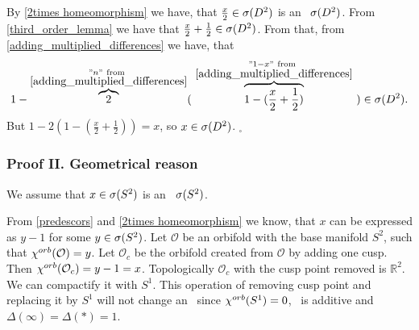 By \ref{2times homeomorphism} we have, that 
$\frac{x}{2} \in {{\sigma}(D^2)}$ is an \apots\ ${{\sigma}(D^2)}$. From \ref{third_order_lemma} we have that 
$\frac{x}{2} + \frac{1}{2} \in {{\sigma}(D^2)}$. From that, from \ref{adding_multiplied_differences} 
we have, 
that \begin{equation}
1-\overbrace{2}^{\substack{"n"\rm\ from\ \\ 
\rm \ref{adding_multiplied_differences}}} 
(\ \overbrace{1-(\frac{x}{2}+\frac{1}{2})}^{\substack{"1-x"\rm\ 
from\ \\ \rm \ref{adding_multiplied_differences}}}\ ) \in \speD.
\end{equation} 
But $1 - 2(1-(\frac{x}{2}+
\frac{1}{2})) = x$, so $x \in {{\sigma}(D^2)}$. $_\square$
\subsubsection{Proof II. Geometrical reason}
We assume that $x \in {{\sigma}(S^2)}$ is an \apots\ ${{\sigma}(S^2)}$.

From \ref{predescors} and \ref{2times homeomorphism} 
we know, that $x$ can be expressed as $y - 1$ for some $y \in {{\sigma}(S^2)}$.
Let $\mathcal{O}$ be an orbifold with the base manifold $S^2$, such that ${\chi^{orb}(\mathcal{O})} 
= y$. 
Let $\mathcal{O}_c$ be the orbifold created from $\mathcal{O}$ by adding one cusp. 
Then ${\chi^{orb}(\mathcal{O}_c)} = y - 1 = x$. Topologically $\mathcal{O}_c$ with the cusp point 
removed 
is $\mathbb{R}^2$. 
We can compactify it with $S^1$. This operation of removing cusp point and replacing it by $S^1$ 
will not change an \Eoc\ since ${\chi^{orb}(S^1)} = 0$, 
\Eoc\ is additive and $\Delta(\infty) = \Delta(\ast) = 1$.

